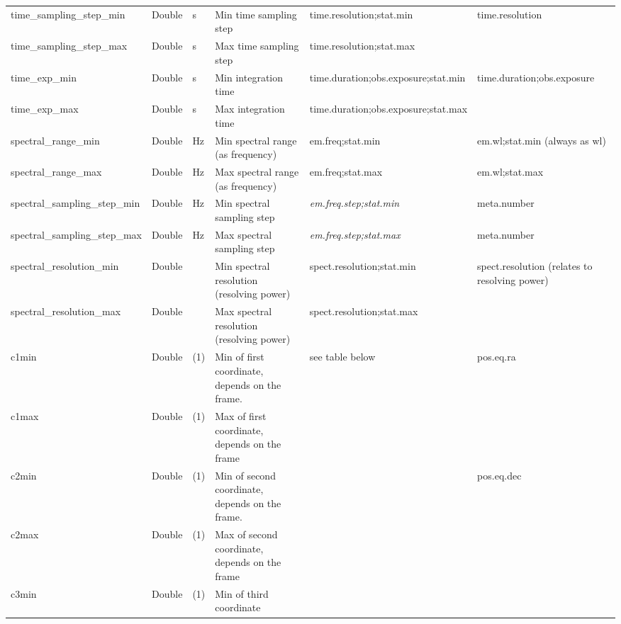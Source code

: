 \documentclass[11pt,a4paper]{ivoa}
\begin{document}
\begin{landscape}
\begin{longtable}{p{3.5cm}p{0.5cm}p{1.4cm}p{1cm}p{7cm}p{5cm}}
time\_sampling\_step\_min&Double&s&Min time sampling step&time.resolution;stat.min&time.resolution \\

time\_sampling\_step\_max&Double&s&Max time sampling step&time.resolution;stat.max&\\

time\_exp\_min&Double&s&Min integration time&time.duration;obs.exposure;stat.min&time.duration;obs.exposure\\

time\_exp\_max&Double&s&Max integration time&time.duration;obs.exposure;stat.max&\\

spectral\_range\_min&Double&Hz&Min spectral range (as frequency)&em.freq;stat.min&em.wl;stat.min (always as wl)\\

spectral\_range\_max&Double&Hz&Max spectral range (as frequency)&em.freq;stat.max&em.wl;stat.max\\

spectral\_sampling\_step\_min&Double&Hz&Min spectral sampling step&\emph{em.freq.step;stat.min} &meta.number\\

spectral\_sampling\_step\_max&Double&Hz&Max spectral sampling step&\emph{em.freq.step;stat.max }&meta.number\\

spectral\_resolution\_min&Double&&Min spectral resolution (resolving power)&spect.resolution;stat.min&spect.resolution (relates to resolving power)\\

spectral\_resolution\_max&Double&&Max spectral resolution (resolving power)&spect.resolution;stat.max&\\

c1min&Double&(1)&Min of first coordinate, depends on the frame. &see table below&pos.eq.ra\\

c1max&Double&(1)&Max of first coordinate, depends on the frame&&\\

c2min&Double&(1)&Min of second coordinate, depends on the frame. &&pos.eq.dec\\

c2max&Double&(1)&Max of second coordinate, depends on the frame&&\\

c3min&Double&(1)&Min of third coordinate&&\\


\end{longtable}
\end{landscape}
\end{document}
